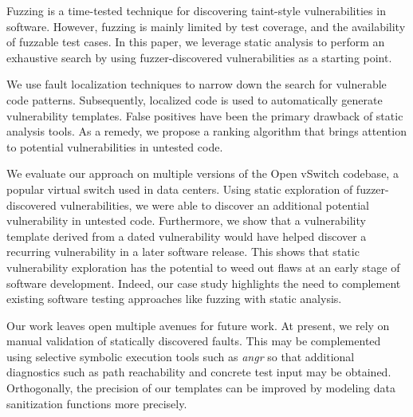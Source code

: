Fuzzing is a time-tested technique for discovering taint-style vulnerabilities in software.
However, fuzzing is mainly limited by test coverage, and the availability of fuzzable test cases.
In this paper, we leverage static analysis to perform an exhaustive search by using fuzzer-discovered vulnerabilities as a starting point.

We use fault localization techniques to narrow down the search for vulnerable code patterns.
Subsequently, localized code is used to automatically generate vulnerability templates.
False positives have been the primary drawback of static analysis tools.
As a remedy, we propose a ranking algorithm that brings attention to potential vulnerabilities in untested code.

We evaluate our approach on multiple versions of the Open vSwitch codebase, a popular virtual switch used in data centers.
Using static exploration of fuzzer-discovered vulnerabilities, we were able to discover an additional potential vulnerability in untested code.
Furthermore, we show that a vulnerability template derived from a dated vulnerability would have helped discover a recurring vulnerability in a later software release.
This shows that static vulnerability exploration has the potential to weed out flaws at an early stage of software development.
Indeed, our case study highlights the need to complement existing software testing approaches like fuzzing with static analysis.

Our work leaves open multiple avenues for future work.
At present, we rely on manual validation of statically discovered faults.
This may be complemented using selective symbolic execution tools such as {\it angr} so that additional diagnostics such as path reachability and concrete test input may be obtained.
Orthogonally, the precision of our templates can be improved by modeling data sanitization functions more precisely.